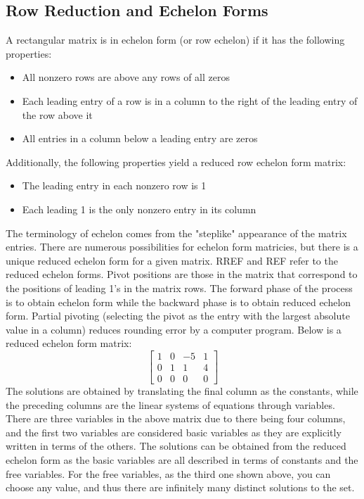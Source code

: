 \documentclass[12pt]{article}
\begin{document}
\subsection{Row Reduction and Echelon Forms}
A rectangular matrix is in echelon form (or row echelon) if it has the following properties:
\begin{itemize}
    \item All nonzero rows are above any rows of all zeros
    \item Each leading entry of a row is in a column to the right of the leading entry of the row above it
    \item All entries in a column below a leading entry are zeros
\end{itemize}
Additionally, the following properties yield a reduced row echelon form matrix:
\begin{itemize}
    \item The leading entry in each nonzero row is 1
    \item Each leading 1 is the only nonzero entry in its column
\end{itemize}
The terminology of echelon comes from the "steplike" appearance of the matrix entries. There are numerous possibilities for echelon form matricies, but %
there is a unique reduced echelon form for a given matrix. RREF and REF refer to the reduced echelon forms. Pivot positions are those in the matrix that %
correspond to the positions of leading 1's in the matrix rows. The forward phase of the process is to obtain echelon form while the backward phase is to %
obtain reduced echelon form. Partial pivoting (selecting the pivot as the entry with the largest absolute value in a column) reduces rounding error by a %
computer program.
\newline
\newline
\noindent Below is a reduced echelon form matrix:
$$
\begin{bmatrix}
    1 & 0 & -5 & 1\\
    0 & 1 & 1 & 4\\
    0 & 0 & 0 & 0
\end{bmatrix}
$$
\newline
The solutions are obtained by translating the final column as the constants, while the preceding columns are the linear systems of equations through variables. %
There are three variables in the above matrix due to there being four columns, and the first two variables are considered basic variables as they are explicitly %
written in terms of the others. The solutions can be obtained from the reduced echelon form as the basic variables are all described in terms of constants and %
the free variables. For the free variables, as the third one shown above, you can choose any value, and thus there are infinitely many distinct solutions to the set.
\newline
\newline
\end{document}
